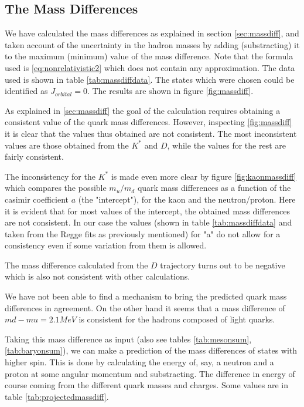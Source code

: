 \documentclass[11pt,a4paper]{article}
\begin{document}
\FloatBarrier
\subsection{The Mass Differences}
\label{sec:confrontmassdiff}
We have calculated the mass differences as explained in section \ref{sec:massdiff}, and taken account of the uncertainty in the hadron masses by adding (substracting) it to the maximum (minimum) value of the mass difference. Note that the formula used is \ref{eq:nonrelativistic2} which does not contain any approximation. The data used is shown in table \ref{tab:massdiffdata}. The states   which were chosen could be identified as $J_{orbital}=0$. The results are shown in figure \ref{fig:massdiff}.

As explained in \ref{sec:massdiff} the goal of the calculation requires obtaining a consistent value of the quark mass differences. However, inspecting \ref{fig:massdiff} it is clear that the values thus obtained are not consistent. The most inconsistent values are those obtained from the $K^{*}$ and $D$, while the values for the rest are fairly consistent. 

The inconsistency for the $K^{*}$ is made even more clear by figure \ref{fig:kaonmassdiff} which compares the possible $m_u/m_d$ quark mass differences as a function of the casimir coefficient $a$ (the "intercept"), for the kaon and the neutron/proton. Here it is evident that for most values of the intercept, the obtained mass differences are not consistent. In our case the values (shown in table \ref{tab:massdiffdata} and taken from the Regge fits as previously mentioned) for "a" do not allow for a consistency even if some variation from them is allowed.

The mass difference calculated from the $D$ trajectory turns out to be negative which is also not consistent with other calculations.

We have not been able to find a mechanism to bring the predicted quark mass differences in agreement. On the other hand it seems that a mass difference of $md-mu=2.1 MeV$ is consistent for the hadrons composed of light quarks.

Taking this mass difference as input (also see tables \ref{tab:mesonsum},\ref{tab:baryonsum}), we can make a prediction of the mass differences of states with higher spin. This is done by calculating the energy of, say, a neutron and a proton at some angular momentum and substracting. The difference in energy of course coming from the different quark masses and charges. Some values are in table \ref{tab:projectedmassdiff}.
\end{document}
